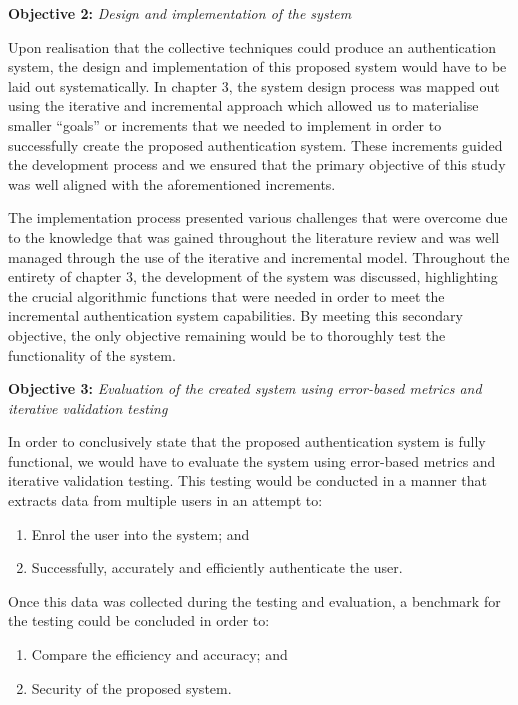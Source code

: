 \textbf{Objective 2:} \textit{Design and implementation of the system}


Upon realisation that the collective techniques could produce an authentication system, the design and implementation of this proposed system would have to be laid out systematically. In chapter 3, the system design process was mapped out using the iterative and incremental approach which allowed us to materialise smaller “goals” or increments that we needed to implement in order to successfully create the proposed authentication system. These increments guided the development process and we ensured that the primary objective of this study was well aligned with the aforementioned increments. 

The implementation process presented various challenges that were overcome due to the knowledge that was gained throughout the literature review and was well managed through the use of the iterative and incremental model. Throughout the entirety of chapter 3, the development of the system was discussed, highlighting the crucial algorithmic functions that were needed in order to meet the incremental authentication system capabilities. By meeting this secondary objective, the only objective remaining would be to thoroughly test the functionality of the system.


\textbf{Objective 3:} \textit{Evaluation of the created system using error-based metrics and iterative validation testing}


In order to conclusively state that the proposed authentication system is fully functional, we would have to evaluate the system using error-based metrics and iterative validation testing. This testing would be conducted in a manner that extracts data from multiple users in an attempt to:

\begin{enumerate}[label=\roman*.]
    \item Enrol the user into the system; and
    \item Successfully, accurately and efficiently authenticate the user.
\end{enumerate}

Once this data was collected during the testing and evaluation, a benchmark for the testing could be concluded in order to: 

\begin{enumerate}[label=\roman*.]
    \item Compare the efficiency and accuracy; and 
    \item Security of the proposed system.
\end{enumerate}


